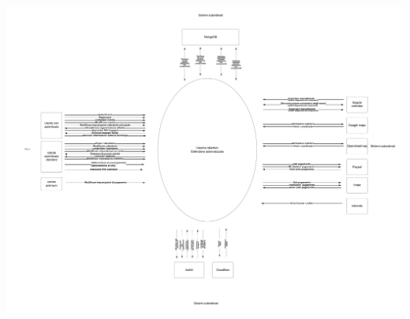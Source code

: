 \begin{listaPersonale}[DCO]{}
    \includegraphics[width=1\textwidth]{img/Diagrammi/Contesto/DiagrammaContesto.png}

\end{listaPersonale}